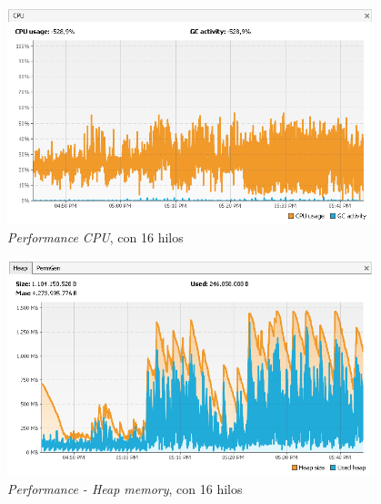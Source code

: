 \begin{table}[H]
\begin{center}
\end{center}
\caption{Resultados en modo paralelo con 16 hilos}
\end{table}

\begin{figure}[H]
\centering
\includegraphics[width=0.95\textwidth]{images/Performance_CPU_16_Threads}
\caption{\emph{Performance CPU}, con 16 hilos}
\label{fig:6.23}
\end{figure}

\begin{figure}[H]
\centering
\includegraphics[width=0.95\textwidth]{images/Performance_HEAP_16_Threads}
\caption{\emph{Performance - Heap memory}, con 16 hilos}
\label{fig:6.24}
\end{figure}

